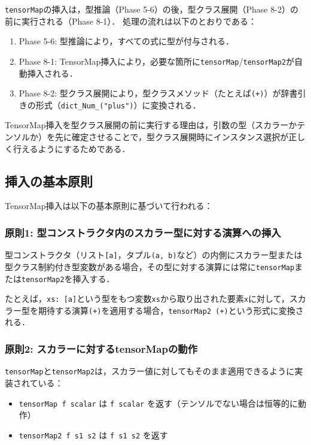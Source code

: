 \lstinline{tensorMap}の挿入は，型推論（Phase 5-6）の後，型クラス展開（Phase 8-2）の前に実行される（Phase 8-1）．
処理の流れは以下のとおりである：

\begin{enumerate}
\item Phase 5-6: 型推論により，すべての式に型が付与される．
\item Phase 8-1: TensorMap挿入により，必要な箇所に\lstinline{tensorMap}/\lstinline{tensorMap2}が自動挿入される．
\item Phase 8-2: 型クラス展開により，型クラスメソッド（たとえば\lstinline{(+)}）が辞書引きの形式（\lstinline{dict_Num_("plus")}）に変換される．
\end{enumerate}

TensorMap挿入を型クラス展開の前に実行する理由は，引数の型（スカラーかテンソルか）を先に確定させることで，型クラス展開時にインスタンス選択が正しく行えるようにするためである．

\subsection{挿入の基本原則}

TensorMap挿入は以下の基本原則に基づいて行われる：

\subsubsection{原則1: 型コンストラクタ内のスカラー型に対する演算への挿入}

型コンストラクタ（リスト\lstinline{[a]}，タプル\lstinline{(a, b)}など）の内側にスカラー型または型クラス制約付き型変数がある場合，その型に対する演算には常に\lstinline{tensorMap}または\lstinline{tensorMap2}を挿入する．

たとえば，\lstinline{xs: [a]}という型をもつ変数\lstinline{xs}から取り出された要素\lstinline{x}に対して，スカラー型を期待する演算\lstinline{(+)}を適用する場合，\lstinline{tensorMap2 (+)}という形式に変換される．

\subsubsection{原則2: スカラーに対するtensorMapの動作}

\lstinline{tensorMap}と\lstinline{tensorMap2}は，スカラー値に対してもそのまま適用できるように実装されている：

\begin{itemize}
\item \lstinline{tensorMap f scalar} は \lstinline{f scalar} を返す（テンソルでない場合は恒等的に動作）
\item \lstinline{tensorMap2 f s1 s2} は \lstinline{f s1 s2} を返す
\end{itemize}

